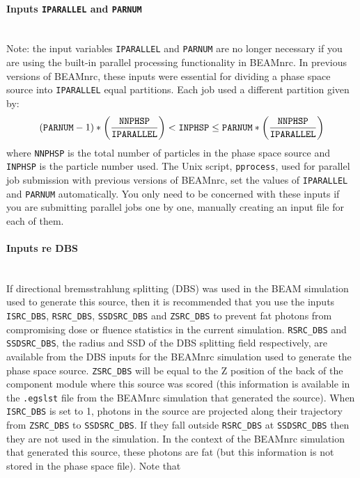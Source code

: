 \documentclass[12pt,twoside]{article}
\begin{document}
\paragraph{Inputs {\tt IPARALLEL} and {\tt PARNUM}}\mbox{}\\
Note: the input variables {\tt IPARALLEL} and {\tt PARNUM} are no longer
necessary if you are using the built-in parallel processing functionality in
BEAMnrc.  In previous versions of BEAMnrc, these inputs were essential
for dividing a phase space source into {\tt IPARALLEL} equal
partitions.  Each job used a different partition given by:
\[ \left({\tt PARNUM}-1\right)*\left(\frac{{\tt NNPHSP}}{{\tt IPARALLEL}}\right)
 <{\tt INPHSP} \leq {\tt PARNUM}*\left(\frac{{\tt NNPHSP}}{{\tt IPARALLEL}}
\right)\]
where {\tt NNPHSP} is the total number of particles in the phase space
source and {\tt INPHSP} is the particle number used.  The Unix
script, {\tt pprocess}, used for parallel job submission with previous
versions of BEAMnrc, set the values of {\tt IPARALLEL} and
{\tt PARNUM} automatically.  You only need to be concerned with these
inputs if you are submitting parallel jobs one by one, manually
creating an input file for each of them.


\paragraph{Inputs re DBS}\mbox{}\\
If directional bremsstrahlung splitting (DBS) was used in the BEAM
simulation used to generate this source, then it is recommended that
you use the inputs {\tt ISRC\_DBS}, {\tt RSRC\_DBS}, {\tt SSDSRC\_DBS}
and {\tt ZSRC\_DBS} to prevent fat photons from compromising dose
or fluence statistics in the current simulation.
{\tt RSRC\_DBS} and {\tt SSDSRC\_DBS}, the radius and SSD of the
DBS splitting field respectively, are available from the DBS inputs for
the BEAMnrc simulation used to generate the phase space source. {\tt ZSRC\_DBS}
will be equal to the Z position of the back of the component module where
this source was scored (this information is available in the {\tt .egslst}
file from the BEAMnrc simulation that generated the source).  When
{\tt ISRC\_DBS} is set to 1, photons in the source are projected along
their trajectory from {\tt ZSRC\_DBS} to {\tt SSDSRC\_DBS}.  If they
fall outside {\tt RSRC\_DBS} at {\tt SSDSRC\_DBS} then they are not
used in the simulation.  In the context of the BEAMnrc simulation that generated
this source, these photons are fat (but this information is not stored
in the phase space file). Note that
\end{document}
